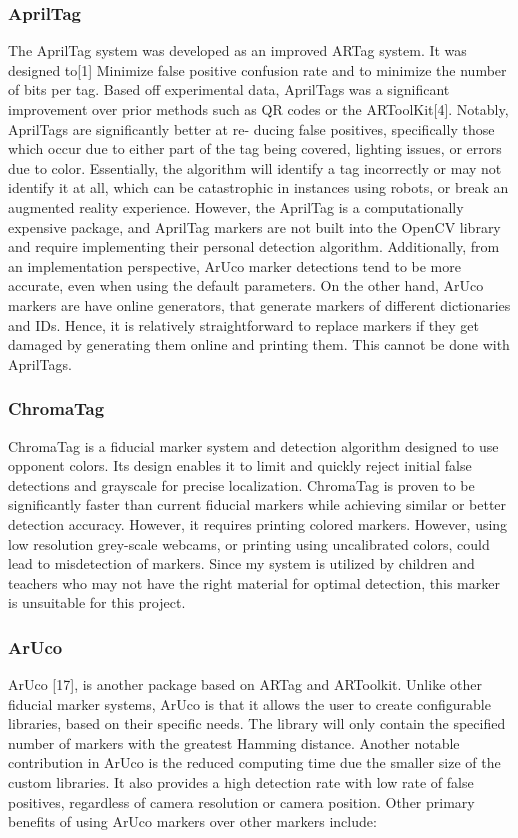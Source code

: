 \documentclass[oneside,%
                    author={Malak Hajji},
                    degree={BSc},
                    title={Designing An Accessible Computational Toolkit For Students},
                  subtitle={With Mixed Visual Abilities}]{dissertation}
\begin{document}
\subsubsection{AprilTag}
The AprilTag system was developed as an improved ARTag system. It was designed to[1]  Minimize false positive confusion rate and to minimize the number of bits per tag.
Based off experimental data, AprilTags was a significant improvement over prior methods such as QR codes or the ARToolKit[4]. Notably, AprilTags are significantly better at re- ducing false positives, specifically those which occur due to either part of the tag being covered, lighting issues, or errors due to color. Essentially, the algorithm will identify a tag incorrectly or may not identify it at all, which can be catastrophic in instances using robots, or break an augmented reality experience. However, the AprilTag is a computationally expensive package, and AprilTag markers are not built into the OpenCV library and require implementing their personal detection algorithm. Additionally, from an implementation perspective, ArUco marker detections tend to be more accurate, even when using the default parameters. On the other hand, ArUco markers are have online generators, that generate markers of different dictionaries and IDs. Hence, it is relatively straightforward to replace markers if they get damaged by generating them online and printing them. This cannot be done with AprilTags.

\subsubsection{ChromaTag}
ChromaTag is a fiducial marker system and detection algorithm designed to use opponent colors. Its design enables it to limit and quickly reject initial false detections and grayscale for precise localization. ChromaTag is proven to be significantly faster than current fiducial markers while achieving similar or better detection accuracy. However, it requires printing colored markers. However, using low resolution grey-scale webcams, or printing using uncalibrated colors, could lead to misdetection of markers. Since my system is utilized by children and teachers who may not have the right material for optimal detection, this marker is unsuitable for this project. 

\subsubsection{ArUco}
ArUco [17], is another package based on ARTag and ARToolkit. Unlike other fiducial marker systems, ArUco is that it allows the user to create configurable libraries, based on their specific needs. The library will only contain the specified number of markers with the greatest Hamming distance. Another notable contribution in ArUco is the reduced computing time due the smaller size of the custom libraries. It also provides a high detection rate with low rate of false positives, regardless of camera resolution or camera position. 
Other primary benefits of using ArUco markers over other markers include:
\end{document}

